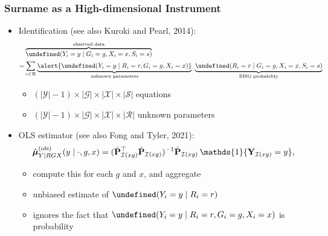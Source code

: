\documentclass{beamer}
\let\Pr\undefined
\DeclareMathOperator{\Pr}{\mathbb{P}}
\newcommand{\ind}{\mathds{1}}
\newcommand{\cI}{\mathcal{I}}
\begin{document}
\begin{frame}

  \frametitle{Surname as a High-dimensional Instrument}

  \begin{itemize}
  \item Identification {\scriptsize (see also Kuroki and Pearl, 2014)}:
    {\small\begin{align*}
     & \overbrace{\Pr(Y_i=y\mid G_i=g, X_i=x, S_i=s)}^{\text{observed data}} \\
    = & \sum_{r\in\mathcal{R}} \underbrace{\alert{\Pr(Y_i=y\mid R_i=r, G_i=g,
        X_i=x)}}_{\text{unknown parameters}}\ \underbrace{\Pr(R_i=r\mid
        G_i=g, X_i=x, S_i=s)}_{\text{BISG probability}}
           \end{align*}}
    \vspace{-.2in}
         \begin{itemize}
         \item $(|\mathcal{Y}|-1)\times|\mathcal{G}|\times|\mathcal{X}|\times|\mathcal{S}|$ equations
         \item
           $(|\mathcal{Y}|-1)\times|\mathcal{G}|\times|\mathcal{X}|\times|\mathcal{R}|$
           unknown parameters
         \end{itemize}
         \vfill
       \item OLS estimator {\scriptsize (see also Fong and Tyler, 2021)}:
         $$
    \hat{\vb*\mu}^{(\text{ols})}_{Y\mid RGX}(y\mid \cdot, g,x) 
    =  (\hat{\vb P}_{\cI(xg)}^\top \hat{\vb P}_{\cI(xg)})^{-1}\hat{\vb P}_{\cI(xg)}\,\ind\{{\vb Y}_{\cI(xg)} = y\},
    $$
    \vspace{-.2in}
    \begin{itemize}
    \item compute this for each $g$ and $x$, and aggregate
    \item unbiased estimate of $\Pr(Y_i= y \mid R_i = r)$
    \item ignores the fact that $\Pr(Y_i= y \mid R_i = r, G_i
      = g, X_i = x)$ is probability
  \end{itemize}
  \end{itemize}

\end{frame}
\end{document}
